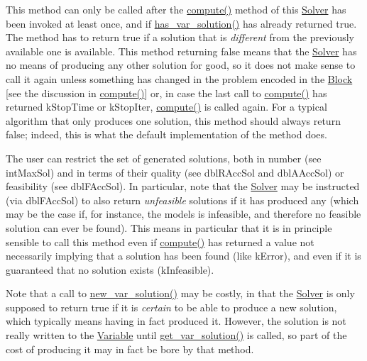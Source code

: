 This method can only be called after the \mbox{\hyperlink{class_s_m_spp__di__unipi__it_1_1_m_c_f_solver_afc8ff54ab05d22f4cca0fb0bfbeb7a49}{compute()}} method of this \mbox{\hyperlink{class_s_m_spp__di__unipi__it_1_1_solver}{Solver}} has been invoked at least once, and if \mbox{\hyperlink{class_s_m_spp__di__unipi__it_1_1_m_c_f_solver_ade6d8078e2b6708ea0fa989629de2419}{has\+\_\+var\+\_\+solution()}} has already returned true. The method has to return true if a solution that is {\itshape different} from the previously available one is available. This method returning false means that the \mbox{\hyperlink{class_s_m_spp__di__unipi__it_1_1_solver}{Solver}} has no means of producing any other solution for good, so it does not make sense to call it again unless something has changed in the problem encoded in the \mbox{\hyperlink{class_s_m_spp__di__unipi__it_1_1_block}{Block}} \mbox{[}see the discussion in \mbox{\hyperlink{class_s_m_spp__di__unipi__it_1_1_m_c_f_solver_afc8ff54ab05d22f4cca0fb0bfbeb7a49}{compute()}}\mbox{]} or, in case the last call to \mbox{\hyperlink{class_s_m_spp__di__unipi__it_1_1_m_c_f_solver_afc8ff54ab05d22f4cca0fb0bfbeb7a49}{compute()}} has returned k\+Stop\+Time or k\+Stop\+Iter, \mbox{\hyperlink{class_s_m_spp__di__unipi__it_1_1_m_c_f_solver_afc8ff54ab05d22f4cca0fb0bfbeb7a49}{compute()}} is called again. For a typical algorithm that only produces one solution, this method should always return false; indeed, this is what the default implementation of the method does.

The user can restrict the set of generated solutions, both in number (see int\+Max\+Sol) and in terms of their quality (see dbl\+R\+Acc\+Sol and dbl\+A\+Acc\+Sol) or feasibility (see dbl\+F\+Acc\+Sol). In particular, note that the \mbox{\hyperlink{class_s_m_spp__di__unipi__it_1_1_solver}{Solver}} may be instructed (via dbl\+F\+Acc\+Sol) to also return {\itshape unfeasible} solutions if it has produced any (which may be the case if, for instance, the models is infeasible, and therefore no feasible solution can ever be found). This means in particular that it is in principle sensible to call this method even if \mbox{\hyperlink{class_s_m_spp__di__unipi__it_1_1_m_c_f_solver_afc8ff54ab05d22f4cca0fb0bfbeb7a49}{compute()}} has returned a value not necessarily implying that a solution has been found (like k\+Error), and even if it is guaranteed that no solution exists (k\+Infeasible).

Note that a call to \mbox{\hyperlink{class_s_m_spp__di__unipi__it_1_1_m_c_f_solver_a62678dc9f7485d5a2992c588c5dc7d49}{new\+\_\+var\+\_\+solution()}} may be costly, in that the \mbox{\hyperlink{class_s_m_spp__di__unipi__it_1_1_solver}{Solver}} is only supposed to return true if it is {\itshape certain} to be able to produce a new solution, which typically means having in fact produced it. However, the solution is not really written to the \mbox{\hyperlink{class_s_m_spp__di__unipi__it_1_1_variable}{Variable}} until \mbox{\hyperlink{class_s_m_spp__di__unipi__it_1_1_m_c_f_solver_ac83fa9679882440d13fb5940494699c5}{get\+\_\+var\+\_\+solution()}} is called, so part of the cost of producing it may in fact be bore by that method.

